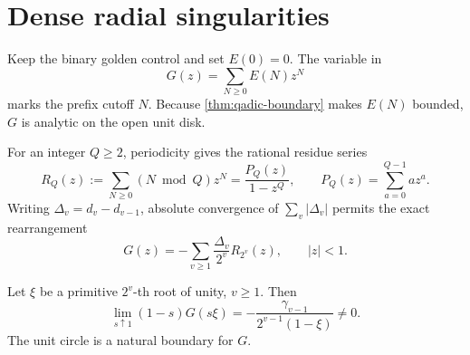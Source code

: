 \section{Dense radial singularities}
\label{sec:natural}

Keep the binary golden control and set \(E(0)=0\).  The variable in
\[
  G(z)=\sum_{N\ge0}E(N)z^N
\]
marks the prefix cutoff \(N\).  Because \cref{thm:qadic-boundary} makes
\(E(N)\) bounded, \(G\) is analytic on the open unit disk.

For an integer \(Q\ge2\), periodicity gives the rational residue series
\begin{equation}
  R_Q(z):=\sum_{N\ge0}(N\bmod Q)z^N
  =\frac{P_Q(z)}{1-z^Q},\qquad
  P_Q(z)=\sum_{a=0}^{Q-1}az^a.
  \label{eq:residue-generating}
\end{equation}
Writing \(\Delta_v=d_v-d_{v-1}\), absolute convergence of
\(\sum_v|\Delta_v|\) permits the exact rearrangement
\begin{equation}
  G(z)=-\sum_{v\ge1}\frac{\Delta_v}{2^v}R_{2^v}(z),
  \qquad |z|<1.
  \label{eq:G-residue}
\end{equation}

\begin{theorem}
\label{thm:natural}
Let \(\xi\) be a primitive \(2^v\)-th root of unity, \(v\ge1\).  Then
\begin{equation}
  \lim_{s\uparrow1}(1-s)G(s\xi)
  =-\frac{\gamma_{v-1}}{2^{v-1}(1-\xi)}\ne0.
  \label{eq:radial-coefficient}
\end{equation}
The unit circle is a natural boundary for \(G\).
\end{theorem}

